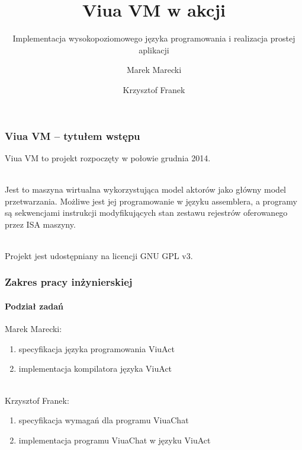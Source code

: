 \documentclass{beamer}
\title{Viua VM w akcji}
\subtitle{Implementacja wysokopoziomowego języka programowania i realizacja prostej aplikacji}
\author{Marek Marecki \and Krzysztof Franek}
\begin{document}


\frame{\titlepage}

\begin{frame}
    \frametitle{Viua VM -- tytułem wstępu}

    Viua VM to projekt rozpoczęty w połowie grudnia 2014.

    ~\\

    Jest to maszyna wirtualna wykorzystująca model aktorów jako główny model przetwarzania.
    Możliwe jest jej programowanie w języku assemblera, a programy są sekwencjami instrukcji modyfikujących
    stan zestawu rejestrów oferowanego przez ISA maszyny.

    ~\\

    Projekt jest udostępniany na licencji GNU GPL v3.
\end{frame}

\begin{frame}
    \frametitle{Zakres pracy inżynierskiej}
    \framesubtitle{Podział zadań}

    Marek Marecki:
    \begin{enumerate}
        \item specyfikacja języka programowania ViuAct
        \item implementacja kompilatora języka ViuAct
    \end{enumerate}

    ~\\

    Krzysztof Franek:
    \begin{enumerate}
        \item specyfikacja wymagań dla programu ViuaChat
        \item implementacja programu ViuaChat w języku ViuAct
    \end{enumerate}
\end{frame}
\end{document}
